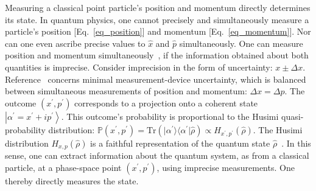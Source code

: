 \documentclass[%
 reprint,
superscriptaddress,
nofootinbib,
bibnotes,
 amsmath,amssymb,
 aps,
]{revtex4-1}
\theoremstyle{plain}
\newcommand*{\ketbra}[2]{\lvert #1 \rangle\!\langle #2 \rvert}
\begin{document}
Measuring a 
classical point particle's position and momentum directly determines its state. 
In quantum physics, one cannot precisely and simultaneously measure a particle's position [Eq.~\eqref{eq_position}] and momentum [Eq.~\eqref{eq_momentum}]. Nor can one even ascribe precise values to $\hat{x}$ and $\hat{p}$ simultaneously.
One can measure position and momentum simultaneously~\cite{Arthurs1965}, if the information obtained about both quantities is imprecise. Consider imprecision in the form of uncertainty: $x\pm\Delta x$. Reference~\cite{Leonhardt1993} concerns minimal measurement-device uncertainty, which is
balanced between simultaneous measurements of position and momentum: $\Delta x=\Delta p$. The outcome $(x^{\prime},p^{\prime})$ corresponds to a projection onto  a coherent state $\left|\alpha^{\prime}=x^{\prime}+ip^{\prime}\right\rangle $. 
This outcome's probability is proportional to the Husimi quasi-probability distribution: $\mathbb{P}(x^{\prime},p^{\prime})
=\mathrm{Tr}  \left(  \ketbra{ \alpha^{\prime} }{ \alpha^{\prime} } \hat{\rho}  \right) 
\propto H_{x^{\prime},p^{\prime}}(\hat{\rho})$. 
The Husimi distribution $H_{x,p}(\hat{\rho})$ is a faithful representation of the quantum state $\hat{\rho}$~\cite{Leonhardt1993}. In this sense, 
one can extract information about the quantum system, as from a classical particle, at a phase-space point $(x^{\prime},p^{\prime})$, using imprecise measurements. One thereby directly measures the state.
\end{document}
